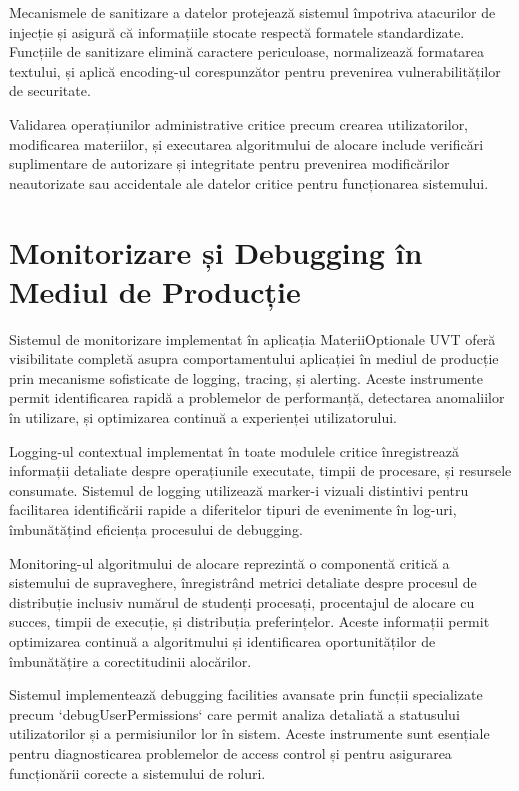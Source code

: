 \documentclass[12pt,a4paper]{report}
\begin{document}
Mecanismele de sanitizare a datelor protejează sistemul împotriva atacurilor de injecție și asigură că informațiile stocate respectă formatele standardizate. Funcțiile de sanitizare elimină caractere periculoase, normalizează formatarea textului, și aplică encoding-ul corespunzător pentru prevenirea vulnerabilităților de securitate.

Validarea operațiunilor administrative critice precum crearea utilizatorilor, modificarea materiilor, și executarea algoritmului de alocare include verificări suplimentare de autorizare și integritate pentru prevenirea modificărilor neautorizate sau accidentale ale datelor critice pentru funcționarea sistemului.

\section{Monitorizare și Debugging în Mediul de Producție}

Sistemul de monitorizare implementat în aplicația MateriiOptionale UVT oferă visibilitate completă asupra comportamentului aplicației în mediul de producție prin mecanisme sofisticate de logging, tracing, și alerting. Aceste instrumente permit identificarea rapidă a problemelor de performanță, detectarea anomaliilor în utilizare, și optimizarea continuă a experienței utilizatorului.

Logging-ul contextual implementat în toate modulele critice înregistrează informații detaliate despre operațiunile executate, timpii de procesare, și resursele consumate. Sistemul de logging utilizează marker-i vizuali distintivi pentru facilitarea identificării rapide a diferitelor tipuri de evenimente în log-uri, îmbunătățind eficiența procesului de debugging.

Monitoring-ul algoritmului de alocare reprezintă o componentă critică a sistemului de supraveghere, înregistrând metrici detaliate despre procesul de distribuție inclusiv numărul de studenți procesați, procentajul de alocare cu succes, timpii de execuție, și distribuția preferințelor. Aceste informații permit optimizarea continuă a algoritmului și identificarea oportunităților de îmbunătățire a corectitudinii alocărilor.

Sistemul implementează debugging facilities avansate prin funcții specializate precum `debugUserPermissions` care permit analiza detaliată a statusului utilizatorilor și a permisiunilor lor în sistem. Aceste instrumente sunt esențiale pentru diagnosticarea problemelor de access control și pentru asigurarea funcționării corecte a sistemului de roluri.
\end{document}
